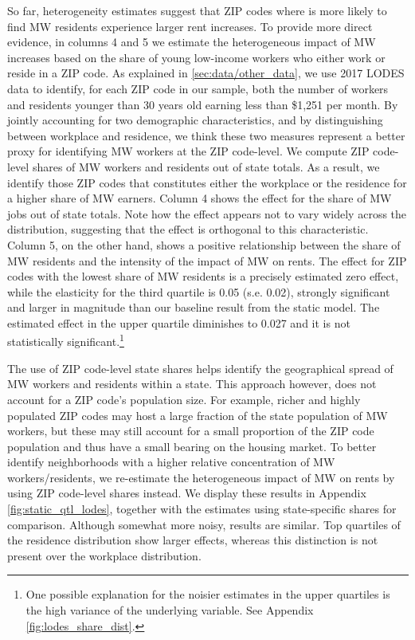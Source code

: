 So far, heterogeneity estimates suggest that ZIP codes where is more likely to find MW residents 
experience larger rent increases. To provide more direct evidence, in columns 4 and 5 we estimate 
the heterogeneous impact of MW increases based on the share of young low-income workers who 
either work or reside in a ZIP code. As explained in \autoref{sec:data/other_data}, we use 2017 
LODES data to identify, for each ZIP code in our sample, both the number of workers and residents 
younger than 30 years old earning less than \$1,251 per month.
By jointly accounting for two demographic characteristics, and by distinguishing between 
workplace and residence, we think these two measures represent a better proxy for identifying MW 
workers at the ZIP code-level. We compute ZIP code-level shares of MW workers and residents out 
of state totals. As a result, we identify those ZIP codes that constitutes either the workplace 
or the residence for a higher share of MW earners. Column 4 shows the effect for the share of MW 
jobs out of state totals. Note how the effect appears not to vary widely across the distribution, 
suggesting that the effect is orthogonal to this characteristic. Column 5, on the other hand, 
shows a positive relationship between the share of MW residents and the intensity of the impact 
of MW on rents. The effect for ZIP codes with the lowest share of MW residents is a precisely 
estimated zero effect, while the elasticity for the third quartile is 0.05 (s.e. 0.02), strongly 
significant and larger in magnitude than our baseline result from the static model. The estimated 
effect in the upper quartile diminishes to 0.027 and it is not statistically 
significant.\footnote{\label{ft:long_tail} One possible explanation for the noisier estimates in 
	the upper quartiles is the high variance of the underlying variable. See Appendix 
	\autoref{fig:lodes_share_dist}.}

The use of ZIP code-level state shares helps identify the geographical spread of MW workers and 
residents within a state. This approach however, does not account for a ZIP code's population 
size. For example, richer and highly populated ZIP codes may host a large fraction of the state 
population of MW workers, but these may still account for a small proportion of the ZIP code 
population and thus have a small bearing on the housing market. To better identify neighborhoods 
with a higher relative concentration of MW workers/residents, we re-estimate the heterogeneous 
impact of MW on rents by using ZIP code-level shares instead. We display these results 
in Appendix \autoref{fig:static_qtl_lodes}, together with the estimates using state-specific 
shares for comparison. Although somewhat more noisy, results are similar. Top quartiles of the 
residence distribution show larger effects, whereas this distinction is not present over the 
workplace distribution.

